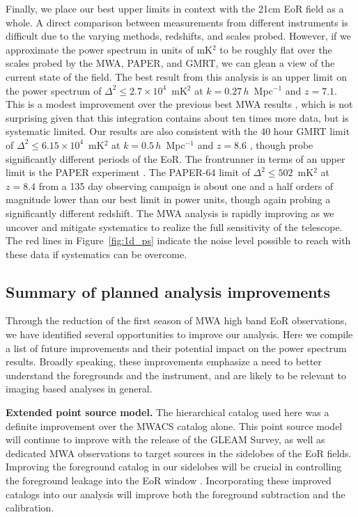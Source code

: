 \documentclass[iop]{emulateapj}
\begin{document}
Finally, we place our best upper limits in context with the 21cm EoR field as a whole. A 
direct comparison between measurements from different instruments is difficult due to the 
varying methods, redshifts, and scales probed. However, if we approximate the power 
spectrum in units of mK$^2$ to be roughly flat over the scales probed by the MWA, PAPER, 
and GMRT, we can glean a view of the current state of the field. 
The best result from this analysis is an upper limit on the power spectrum of 
$\Delta^2 \le 2.7 \times 10^4$~mK$^2$ at $k=0.27\, h$~Mpc$^{-1}$ and $z=7.1$.
This is a modest improvement over the previous best MWA results \citep{Dillon:2015}, 
which is not surprising given that this integration contains about ten times more data, but 
is systematic limited. Our results are also consistent with the 
40 hour GMRT limit of $\Delta^2\le6.15\times10^4$~mK$^2$ at $k=0.5\, h$~Mpc$^{-1}$ and $z=8.6$ \citep{Paciga:2013}, though 
probe significantly different periods of the EoR. The frontrunner in terms of an upper limit is 
the PAPER experiment \citep{Ali:2015, Jacobs:2015, Parsons:2014}. The PAPER-64 limit of 
$\Delta^2\le502$~mK$^2$ at $z=8.4$ from a 135 day observing campaign is about one and a half orders of magnitude lower 
than our best limit in power units, though again probing a significantly different redshift. 
The MWA analysis is rapidly improving as we uncover and mitigate systematics to realize
the full sensitivity of the telescope.
The red lines in Figure~\ref{fig:1d_ps} indicate the noise level possible 
to reach with these data if systematics can be overcome.

\subsection{Summary of planned analysis improvements}
Through the reduction of the first season of MWA high band EoR observations, we have
identified several opportunities to improve our analysis. Here we compile a list of future
improvements and their potential impact on the power spectrum results. Broadly speaking,
these improvements emphasize a need to better understand the foregrounds and the 
instrument, and are likely to be relevant to imaging based analyses in general.

\textbf{Extended point source model.} The hierarchical catalog used here was a definite
improvement over the MWACS catalog alone. This point source model will continue
to improve with the release of the GLEAM Survey, as well as dedicated MWA observations 
to target sources in the sidelobes of the EoR fields. Improving the foreground catalog
in our sidelobes will be crucial in controlling the foreground leakage into the EoR window
\citep{Pober:2016}. Incorporating these improved catalogs
into our analysis will improve both the foreground subtraction and the calibration.
\end{document}
